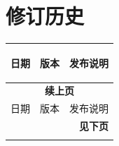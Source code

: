 \section*{修订历史}\label{revision-history}
\rhead{\Navigation}

\begin{longtable}[l]{ | m{2cm} | m{1.5cm} | m{12cm} | }\hline

    \rowcolor{lightgray}
    日期 & 版本 & \hypertarget{Release notes}{发布说明}\\\hline
    \endfirsthead

    \multicolumn{3}{c}{\bfseries 续上页}\\\hline
    \rowcolor{lightgray}
    日期 & 版本 & 发布说明\\\hline
    \endhead

    \multicolumn{3}{r}{\textbf{见下页}}\\
    \endfoot

    \endlastfoot



\end{longtable}
